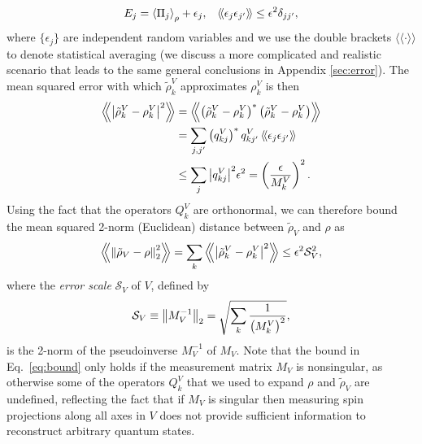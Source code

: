 \documentclass[notitlepage,twocolumn]{revtex4-2}
\newcommand{\f}[2]{\dfrac{#1}{#2}} %
\newcommand{\p}[1]{\left(#1\right)} %
\renewcommand{\set}[1]{\{#1\}} %
\newcommand{\bk}{\Braket} %
\newcommand{\bbk}[1]{\langle\!\langle #1 \rangle\!\rangle}
\newcommand{\Bbk}[1]
{\left\langle\!\!\left\langle #1 \right\rangle\!\!\right\rangle}
\newcommand{\1}{\mathds{1}}
\renewcommand{\S}{\mathcal{S}}
\begin{document}
\begin{align}
  E_j = \bk{\Pi_j}_\rho + \epsilon_j,
  &&
  \bbk{\epsilon_j \epsilon_{j'}} \le \epsilon^2 \delta_{jj'},
\end{align}
where $\set{\epsilon_j}$ are independent random variables and we use the double brackets $\bbk{\cdot}$ to denote statistical averaging (we discuss a more complicated and realistic scenario that leads to the same general conclusions in Appendix \ref{sec:error}).
The mean squared error with which $\tilde\rho^V_k$ approximates $\rho^V_k$ is then
\begin{align}
  \Bbk{\abs{\tilde\rho^V_k-\rho^V_k}^2}
  &= \Bbk{\p{\tilde\rho^V_k-\rho^V_k}^*\p{\tilde\rho^V_k-\rho^V_k}} \\
  &= \sum_{j,j'} \p{q^V_{kj}}^* q^V_{kj'}\,
  \bbk{\epsilon_j \epsilon_{j'}} \\
  &\le \sum_j \abs{q^V_{kj}}^2 \epsilon^2
  = \p{\f{\epsilon}{M^V_k}}^2.
\end{align}
Using the fact that the operators $Q^V_k$ are orthonormal, we can therefore bound the mean squared 2-norm (Euclidean) distance between $\tilde\rho_V$ and $\rho$ as
\begin{align}
  \Bbk{\norm{\tilde\rho_V-\rho}_2^2}
  = \sum_k \Bbk{\abs{\tilde\rho^V_k - \rho^V_k}^2}
  \le \epsilon^2 \S_V^2,
  \label{eq:bound}
\end{align}
where the {\it error scale} $\S_V$ of $V$, defined by
\begin{align}
  \S_V \equiv \norm{M_V^{-1}}_2 = \sqrt{\sum_k\f1{\p{M^V_k}^2}},
  \label{eq:scale}
\end{align}
is the 2-norm of the pseudoinverse $M_V^{-1}$ of $M_V$.
Note that the bound in Eq.~\eqref{eq:bound} only holds if the measurement matrix $M_V$ is nonsingular, as otherwise some of the operators $Q^V_k$ that we used to expand $\rho$ and $\tilde\rho_V$ are undefined, reflecting the fact that if $M_V$ is singular then measuring spin projections along all axes in $V$ does not provide sufficient information to reconstruct arbitrary quantum states.
\end{document}

